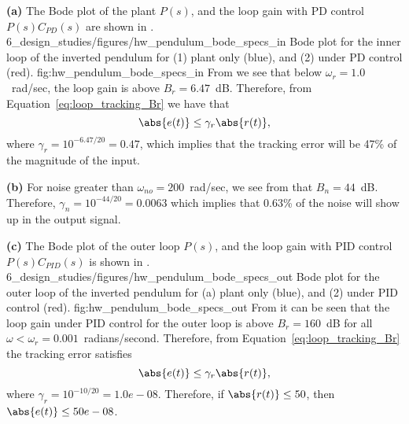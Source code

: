 
{\bf (a)} The Bode plot of the plant $P(s)$, and the loop gain with PD control $P(s)C_{PD}(s)$ are shown in .
	{6_design_studies/figures/hw_pendulum_bode_specs_in}
	{Bode plot for the inner loop of the inverted pendulum for (1) plant only (blue), and (2) under PD control (red).}
	{fig:hw_pendulum_bode_specs_in}
From  we see that below $\omega_r = 1.0$~rad/sec, the loop gain is above $B_r=6.47$~dB.  Therefore, from Equation~\eqref{eq:loop_tracking_Br} we have that
\[
\abs{e(t)} \leq \gamma_r \abs{r(t)},
\]
where $\gamma_r = 10^{-6.47/20} = 0.47$, which implies that the tracking error will be 47\% of the magnitude of the input.

{\bf (b)} For noise greater than $\omega_{no}=200$~rad/sec, we see from  that $B_n = 44$~dB.  Therefore, $\gamma_n = 10^{-44/20} = 0.0063$ which implies that $0.63$\% of the noise will show up in the output signal.

{\bf (c)}  
The Bode plot of the outer loop $P(s)$, and the loop gain with PID control $P(s)C_{PID}(s)$ is shown in .
	{6_design_studies/figures/hw_pendulum_bode_specs_out}
	{Bode plot for the outer loop of the inverted pendulum for (a) plant only (blue), and (2) under PID control (red).}
	{fig:hw_pendulum_bode_specs_out}
From  it can be seen that the loop gain under PID control for the outer loop is above $B_r=160$~dB for all $\omega<\omega_r=0.001$~radians/second.  Therefore, from Equation~\eqref{eq:loop_tracking_Br} the tracking error satisfies
\[
\abs{e(t)}\leq \gamma_r \abs{r(t)},
\]
where $\gamma_r = 10^{-10/20}=1.0e-08$.  Therefore, if $\abs{r(t)}\leq 50$, then $\abs{e(t)}\leq 50e-08$.

